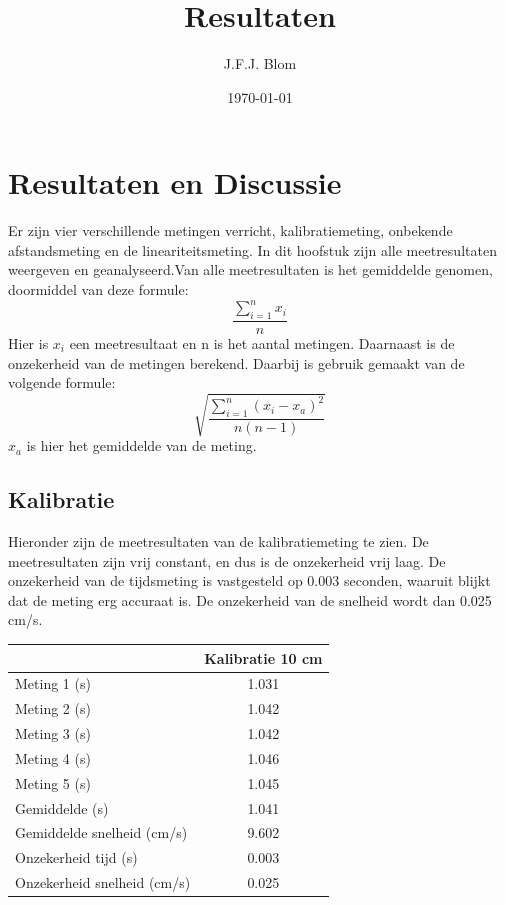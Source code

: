\documentclass[12pt]{book}
\title{Resultaten}
\author{J.F.J. Blom}
\date{\today}
\begin{document}
\section*{Resultaten en Discussie}
Er zijn vier verschillende metingen verricht, kalibratiemeting, onbekende afstandsmeting en de lineariteitsmeting. In dit hoofstuk zijn alle meetresultaten weergeven en geanalyseerd.Van alle meetresultaten is het gemiddelde genomen, doormiddel van deze formule:
$$\frac{\sum_{i=1}^{n}x_i}{n}$$
Hier is $x_i$ een meetresultaat en n is het aantal metingen. 
Daarnaast is de onzekerheid van de metingen berekend. Daarbij is gebruik gemaakt van de volgende formule:
$$\sqrt{\frac{\sum_{i=1}^{n}( x_i-x_a)^2}{n(n-1)}}$$
$x_a$ is hier het gemiddelde van de meting.
\subsection*{Kalibratie}
Hieronder zijn de meetresultaten van de kalibratiemeting te zien. De meetresultaten zijn vrij constant, en dus is de onzekerheid vrij laag. De onzekerheid van de tijdsmeting is vastgesteld op 0.003 seconden, waaruit blijkt dat de meting erg accuraat is. De onzekerheid van de snelheid wordt dan 0.025 cm/s. 

\begin{center}
\begin{tabular}{| l| c|}
\hline
    & Kalibratie 10 cm \\
\hline
   Meting 1 (s) & 1.031 \\
\hline
   Meting 2 (s) & 1.042 \\
\hline
   Meting 3 (s) & 1.042 \\
\hline
   Meting 4 (s) & 1.046 \\
\hline
   Meting 5 (s) & 1.045 \\
\hline
   Gemiddelde (s) & 1.041 \\
\hline
   Gemiddelde snelheid (cm/s) & 9.602 \\
\hline
   Onzekerheid tijd (s) & 0.003 \\
\hline
   Onzekerheid snelheid (cm/s) & 0.025 \\
\hline
\end{tabular}
\end{center}
\end{document}
